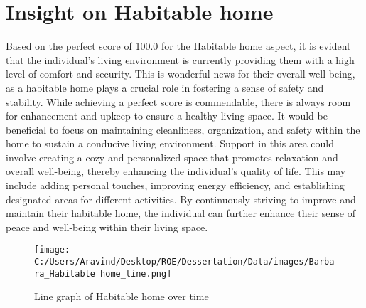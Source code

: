 \documentclass[10pt, a4paper]{article}%
\begin{document}
%
\section{Insight on Habitable home}%
\label{sec:InsightonHabitablehome}%
Based on the perfect score of 100.0 for the Habitable home aspect, it is evident that the individual's living environment is currently providing them with a high level of comfort and security. This is wonderful news for their overall well{-}being, as a habitable home plays a crucial role in fostering a sense of safety and stability.\newline%
\newline%
While achieving a perfect score is commendable, there is always room for enhancement and upkeep to ensure a healthy living space. It would be beneficial to focus on maintaining cleanliness, organization, and safety within the home to sustain a conducive living environment.\newline%
\newline%
Support in this area could involve creating a cozy and personalized space that promotes relaxation and overall well{-}being, thereby enhancing the individual's quality of life. This may include adding personal touches, improving energy efficiency, and establishing designated areas for different activities.\newline%
\newline%
By continuously striving to improve and maintain their habitable home, the individual can further enhance their sense of peace and well{-}being within their living space.%


\begin{figure}[H]%
\centering%
\texttt{[image: C:/Users/Aravind/Desktop/ROE/Dessertation/Data/images/Barbara\_Habitable home\_line.png]}%
\caption{Line graph of Habitable home over time}%
\end{figure}

%
\end{document}
